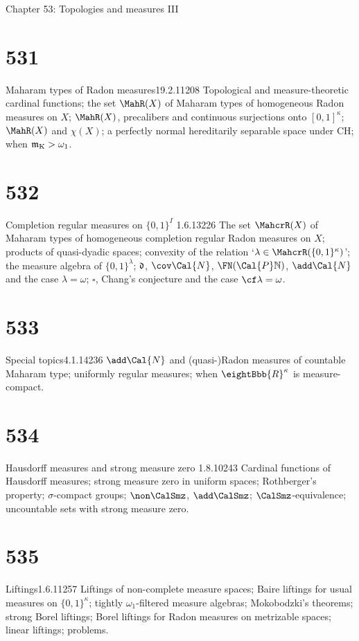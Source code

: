 
Chapter 53:  Topologies and measures III


\section{531}{Maharam types of Radon measures}{19.2.11}{}{208}
{Topological and measure-theoretic cardinal functions;  the set
$\MahR(X)$ of Maharam types of homogeneous Radon measures on $X$;
$\MahR(X)$, precalibers and continuous surjections onto
$[0,1]^{\kappa}$;  $\MahR(X)$ and $\chi(X)$;  a perfectly normal
hereditarily separable space
under CH;  when $\frak{m}_{\text{K}}>\omega_1$.}

\section{532}{Completion regular measures on $\{0,1\}^I$}
{1.6.13}{}{226}
{The set $\MahcrR(X)$ of Maharam types of homogeneous completion regular
Radon measures on $X$;  products of quasi-dyadic spaces;  convexity of
the relation `$\lambda\in\MahcrR(\{0,1\}^{\kappa})$';  the measure algebra
of $\{0,1\}^{\lambda}$;   $\frak{d}$, $\cov\Cal{N}$, $\FN(\Cal{P}\Bbb{N})$,
$\add\Cal{N}$ and
the case $\lambda=\omega$;  $\square$, Chang's conjecture and the case
$\cf\lambda=\omega$.}

\section{533}{Special topics}{4.1.14}{}{236}
{$\add\Cal{N}$ and (quasi-)Radon measures of countable Maharam type;
uniformly regular measures;  when $\eightBbb{R}^{\kappa}$ is
measure-compact.}

\section{534}{Hausdorff measures and strong measure zero}
{1.8.10}{}{243}
{Cardinal functions of Hausdorff measures;  
strong measure zero in uniform spaces;  Rothberger's property;
$\sigma$-compact groups;
$\non\CalSmz$, $\add\CalSmz$;  $\CalSmz$-equivalence;  uncountable sets
with strong measure zero.}

\section{535}{Liftings}{1.6.11}{}{257}
{Liftings of non-complete measure
spaces;  Baire liftings for usual measures on $\{0,1\}^{\kappa}$;
tightly $\omega_1$-filtered measure algebras;  Mokobodzki's theorems;
strong Borel liftings;  Borel liftings for Radon measures on metrizable
spaces;  linear liftings;  problems.}


